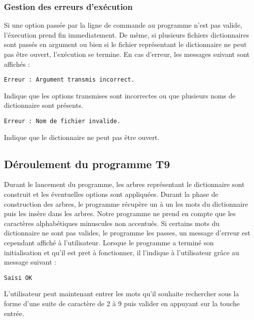 \documentclass[15pt, a4paper]{article}
\begin{document}
\subsubsection{Gestion des erreurs d'exécution}

Si une option passée par la ligne de commande au programme n'est pas valide, l'éxecution prend fin 
immediatement. De même, si plusieurs fichiers dictionnaires sont passés en argument ou bien si le fichier
représentant le dictionnaire ne peut pas être ouvert, l'exécution se termine. En cas d'erreur, les messages
suivant sont affichés :

\begin{verbatim}
Erreur : Argument transmis incorrect.
\end{verbatim}

\noindent Indique que les options transmises sont incorrectes ou que plusieurs noms de dictionnaire sont présents.

\begin{verbatim}
Erreur : Nom de fichier invalide.
\end{verbatim}

\noindent Indique que le dictionnaire ne peut pas être ouvert.

\subsection{Déroulement du programme T9}

Durant le lancement du programme, les arbres représentant le dictionnaire sont construit et les éventuelles options
sont appliquées. Durant la phase de construction des arbres, le programme récupère un à un les mots du dictionnaire puis 
les insère dans les arbres. Notre programme ne prend en compte que les caractères alphabétiques minuscules non accentués.
Si certains mots du dictionnaire ne sont pas valides, le programme les passes, un message d'erreur est cependant affiché 
à l'utilisateur. Lorsque le programme a terminé son initialisation et qu'il est pret à fonctionner, il l'indique à 
l'utilisateur grâce au message suivant :

\begin{verbatim}
Saisi OK
\end{verbatim}

L'utilisateur peut maintenant entrer les mots qu'il souhaite rechercher sous la forme d'une suite de caractère de
2 à 9 puis valider en appuyant sur la touche entrée.

\bigskip
\end{document}

